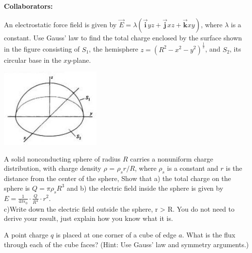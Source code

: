 \documentclass[11pt,letterpaper,boxed]{hmcpset}
\begin{document}
	
	\noindent\textbf{Collaborators:} 
	
	
	\begin{problem}[Schey II-8] An electrostatic force field is given by $\vec{E} = \lambda (\vec{\textbf{i}}yz + \vec{\textbf{j}}xz + \vec{\textbf{k}}xy)$, where $\lambda$ is a constant. Use Gauss' law to find the total charge enclosed by the surface shown in the figure consisting of $S_1$, the hemisphere $z = (R^2 - x^2 - y^2)^{\frac{1}{2}}$, and $S_2$, its circular base in the $xy$-plane.
		\begin{center}
			\includegraphics[scale=0.9]{51m3pic2.jpg}
		\end{center}
		
	\end{problem}
	
	\begin{solution}
		\vfill
	\end{solution}
	\newpage

	\begin{problem}[Schey II-10] A solid nonconducting sphere of radius $R$ carries a nonuniform charge distribution, with charge density $\rho$ = $\rho_s r/R$, where $\rho_s$ is a constant and $r$ is the distance from the center of the sphere, Show that a) the total charge on the sphere is $Q = \pi\rho_s R^3$ and b) the electric field inside the sphere is given by $E = \frac{1}{4\pi\epsilon_0}\cdot\frac{Q}{R^4} \cdot r^2$. \\ c)Write down the electric field outside the sphere, r > R. You do not need to derive your result, just explain how you know what it is.
		
		
	\end{problem}
	
	\begin{solution}
		\vfill
	\end{solution}
	\newpage

	\begin{problem}[HRK E27.11]
		A point charge $q$ is placed at one corner of a cube of edge $a$. What is the flux through each of the cube faces? (Hint: Use Gauss' law and symmetry arguments.)
		
	\end{problem}
	
\end{document}
